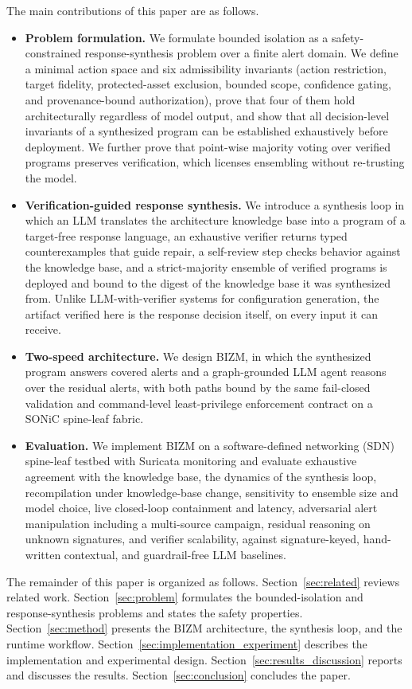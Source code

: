 \documentclass[final,5p]{elsarticle}
\begin{document}
The main contributions of this paper are as follows.
\begin{itemize}
    \item \textbf{Problem formulation.} We formulate bounded isolation as a safety-constrained response-synthesis problem over a finite alert domain. We define a minimal action space and six admissibility invariants (action restriction, target fidelity, protected-asset exclusion, bounded scope, confidence gating, and provenance-bound authorization), prove that four of them hold architecturally regardless of model output, and show that all decision-level invariants of a synthesized program can be established exhaustively before deployment. We further prove that point-wise majority voting over verified programs preserves verification, which licenses ensembling without re-trusting the model.
    \item \textbf{Verification-guided response synthesis.} We introduce a synthesis loop in which an LLM translates the architecture knowledge base into a program of a target-free response language, an exhaustive verifier returns typed counterexamples that guide repair, a self-review step checks behavior against the knowledge base, and a strict-majority ensemble of verified programs is deployed and bound to the digest of the knowledge base it was synthesized from. Unlike LLM-with-verifier systems for configuration generation, the artifact verified here is the response decision itself, on every input it can receive.
    \item \textbf{Two-speed architecture.} We design BIZM, in which the synthesized program answers covered alerts and a graph-grounded LLM agent reasons over the residual alerts, with both paths bound by the same fail-closed validation and command-level least-privilege enforcement contract on a SONiC spine-leaf fabric.
    \item \textbf{Evaluation.} We implement BIZM on a software-defined networking (SDN) spine-leaf testbed with Suricata monitoring and evaluate exhaustive agreement with the knowledge base, the dynamics of the synthesis loop, recompilation under knowledge-base change, sensitivity to ensemble size and model choice, live closed-loop containment and latency, adversarial alert manipulation including a multi-source campaign, residual reasoning on unknown signatures, and verifier scalability, against signature-keyed, hand-written contextual, and guardrail-free LLM baselines.
\end{itemize}

The remainder of this paper is organized as follows. Section~\ref{sec:related} reviews related work. Section~\ref{sec:problem} formulates the bounded-isolation and response-synthesis problems and states the safety properties. Section~\ref{sec:method} presents the BIZM architecture, the synthesis loop, and the runtime workflow. Section~\ref{sec:implementation_experiment} describes the implementation and experimental design. Section~\ref{sec:results_discussion} reports and discusses the results. Section~\ref{sec:conclusion} concludes the paper.
\end{document}
